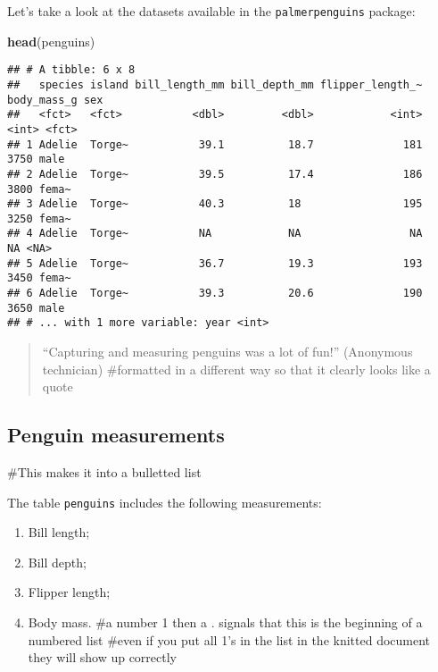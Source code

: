 \documentclass[
]{book}
\newenvironment{Shaded}{\begin{snugshade}}{\end{snugshade}}
\newcommand{\KeywordTok}[1]{\textcolor[rgb]{0.13,0.29,0.53}{\textbf{#1}}}
\newcommand{\NormalTok}[1]{#1}
\providecommand{\tightlist}{%
  \setlength{\itemsep}{0pt}\setlength{\parskip}{0pt}}
\begin{document}
Let's take a look at the datasets available in the \texttt{palmerpenguins} package:

\begin{Shaded}
\begin{Highlighting}[]
\KeywordTok{head}\NormalTok{(penguins)}
\end{Highlighting}
\end{Shaded}

\begin{verbatim}
## # A tibble: 6 x 8
##   species island bill_length_mm bill_depth_mm flipper_length_~ body_mass_g sex  
##   <fct>   <fct>           <dbl>         <dbl>            <int>       <int> <fct>
## 1 Adelie  Torge~           39.1          18.7              181        3750 male 
## 2 Adelie  Torge~           39.5          17.4              186        3800 fema~
## 3 Adelie  Torge~           40.3          18                195        3250 fema~
## 4 Adelie  Torge~           NA            NA                 NA          NA <NA> 
## 5 Adelie  Torge~           36.7          19.3              193        3450 fema~
## 6 Adelie  Torge~           39.3          20.6              190        3650 male 
## # ... with 1 more variable: year <int>
\end{verbatim}

\begin{quote}
``Capturing and measuring penguins was a lot of fun!'' (Anonymous technician)
\#formatted in a different way so that it clearly looks like a quote
\end{quote}

\hypertarget{penguin-measurements}{%
\subsection{Penguin measurements}\label{penguin-measurements}}

\#This makes it into a bulletted list

The table \texttt{penguins} includes the following measurements:

\begin{enumerate}
\def\labelenumi{\arabic{enumi}.}
\tightlist
\item
  Bill length;
\item
  Bill depth;
\item
  Flipper length;
\item
  Body mass.
  \#a number 1 then a . signals that this is the beginning of a numbered list
  \#even if you put all 1's in the list in the knitted document they will show up correctly
\end{enumerate}
\end{document}

